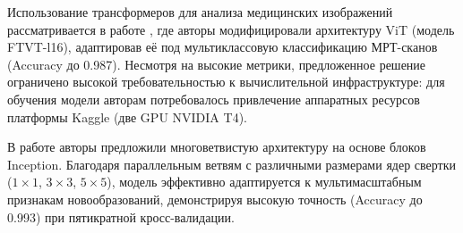\documentclass[eqsecnum, authorsinfo]{kioj6}
\begin{document}

Использование трансформеров для анализа медицинских изображений рассматривается в работе \cite{3}, где авторы модифицировали архитектуру ViT (модель FTVT-l16), 
адаптировав её под мультиклассовую классификацию МРТ-сканов (Accuracy до 0.987). Несмотря на высокие метрики, предложенное решение ограничено 
высокой требовательностью к вычислительной инфраструктуре: для обучения модели авторам потребовалось привлечение аппаратных ресурсов платформы Kaggle (две GPU NVIDIA T4).




В работе \cite{4} авторы предложили многоветвистую архитектуру на основе блоков Inception. Благодаря параллельным ветвям с различными размерами 
ядер свертки ($1\times1$, $3\times3$, $5\times5$), модель эффективно адаптируется к мультимасштабным признакам 
новообразований, демонстрируя высокую точность (Accuracy до 0.993) при пятикратной кросс-валидации. 
\end{document}
